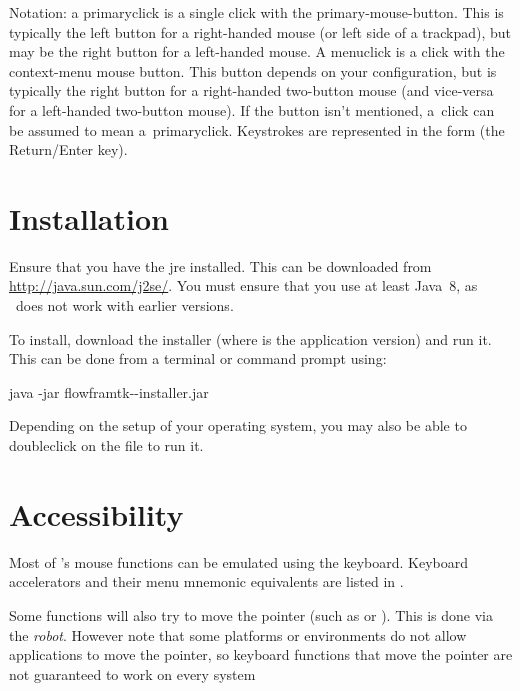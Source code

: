 Notation: a \gls{primaryclick} is a single click with the
\gls{primary-mouse-button}. This is typically the left button for a
right-handed mouse (or left side of a trackpad), but may be the
right button for a left-handed mouse. A \gls{menuclick} is a click
with the \gls{context-menu} mouse button. This button depends on your
configuration, but is typically the right button for a right-handed
two-button mouse (and vice-versa for a left-handed two-button mouse). 
If the button isn't mentioned, a~\gls{click} can
be assumed to mean a~\gls{primaryclick}. Keystrokes are represented
in the form  (the Return\slash Enter key).

\chapter{Installation}
\label{sec:install}

Ensure that you have the \gls{jre} installed.
This can be downloaded from \url{http://java.sun.com/j2se/}.
You must ensure that you use at least Java~8, as \FlowframTk\
does not work with earlier versions.

To install, download the installer
(where  is the application version) and run it. 
This can be done from a terminal or command prompt using:

\begin{terminal}
java -jar flowframtk--installer.jar
\end{terminal}

Depending on the setup of your operating system, you may also be
able to \gls{doubleclick} on the \ext{jar} file to run it.


\chapter{Accessibility}
\label{sec:access}

Most of \FlowframTk's mouse functions can be emulated using the
keyboard. Keyboard accelerators and
their menu mnemonic equivalents are listed in .

\begin{information}
Some functions will also try to move the pointer (such as
 or ). This is done via the \emph{\gls{robot}}.
However note that some platforms or environments do not allow applications
to move the pointer, so keyboard functions that move the pointer are
not guaranteed to work on every system
\end{information}

